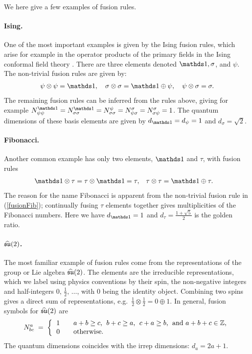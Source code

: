 We here give a few examples of fusion rules.


\paragraph{Ising.}
One of the most important examples is given by the Ising fusion rules, which arise for example in the operator products of the primary fields in the Ising conformal field theory \cite{BPZ:CFT:84}. There are three elements denoted $\I, \sigma$, and $\psi$. The non-trivial fusion rules are given by:
\begin{align}
	\psi \otimes \psi = \I, \quad \sigma \otimes \sigma = \I \oplus \psi, \quad \psi \otimes \sigma = \sigma.
	\label{eq:Ising_fusion_rules}
\end{align}
The remaining fusion rules can be inferred from the rules above, giving for example $N_{\psi \psi}^\I = N_{\sigma \sigma}^\I = N_{\sigma \sigma}^\psi = N_{\psi \sigma}^\sigma = N_{\sigma \psi}^\sigma = 1$.
The quantum dimensions of these basis elements are given by $d_\I = d_\psi = 1$ and $d_\sigma=\sqrt{2}$.

\paragraph{Fibonacci.}
Another common example has only two elements, $\I$ and $\tau$, with fusion rules
\begin{align} 
	\I \otimes \tau &= \tau \otimes \I = \tau,
	&	\tau \otimes \tau &= \I \oplus \tau.
\label{fusionFib}
\end{align}
The reason for the name Fibonacci is apparent from the non-trivial fusion rule in (\ref{fusionFib}); continually fusing $\tau$ elements together gives multiplicities of the Fibonacci numbers.
Here we have $d_\I=1$ and $d_\tau=\frac{1+\sqrt{5}}{2}$ is the golden ratio.

\paragraph{${\widehat{\mathfrak{su}}(2)}$.}  The most familiar example of fusion rules come from the representations of the group or Lie algebra ${\widehat{\mathfrak{su}}(2)}$.
The elements are the irreducible representations, which we label using physics conventions by their spin, the non-negative integers and half-integers $0,\,\frac12,\,\dots$, with $0$ being the identity object.
Combining two spins gives a direct sum of representations, e.g.\ $\frac12 \otimes \frac12 = 0 \oplus 1$.
In general, fusion symbols for ${\widehat{\mathfrak{su}}(2)}$ are
\begin{align}
	N^a_{bc} \;=\; \bigg\{ \begin{tabular}{l @{\qquad} l}
		1	&	$a+b \geq c$,\; $b+c \geq a$,\; $c+a \geq b$,\; and $a+b+c \in \mathbb{Z}$,
	\\[0.2ex]	0	&	otherwise.
	\end{tabular}
	\label{eq:def_SU2_N}
\end{align}
The quantum dimensions coincides with the irrep dimensions: $d_a = 2a+1$.


